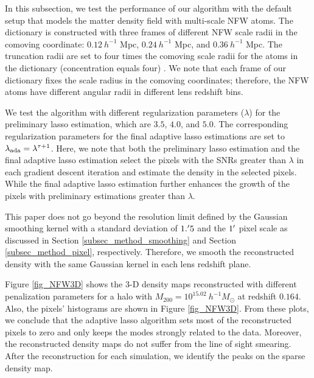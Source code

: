 In this subsection, we test the performance of our algorithm with the default
setup that models the matter density field with multi-scale NFW atoms. The
dictionary is constructed with three frames of different NFW scale radii in the
comoving coordinate: $0.12~h^{-1}$ Mpc, $0.24~h^{-1}$ Mpc, and $0.36~h^{-1}$
Mpc.  The truncation radii are set to four times the comoving scale radii for
the atoms in the dictionary (concentration equals four) . We note that each
frame of our dictionary fixes the scale radius in the comoving coordinates;
therefore, the NFW atoms have different angular radii in different lens
redshift bins.

We test the algorithm with different regularization parameters ($\lambda$) for
the preliminary lasso estimation, which are $3.5$, $4.0$, and $5.0$. The
corresponding regularization parameters for the final adaptive lasso
estimations are set to $\lambda_{\rm{ada}}=\lambda^{\tau+1}$.  Here, we note
that both the preliminary lasso estimation and the final adaptive lasso
estimation select the pixels with the SNRs greater than $\lambda$ in each
gradient descent iteration and estimate the density in the selected pixels.
While the final adaptive lasso estimation further enhances the growth of the
pixels with preliminary estimations greater than $\lambda$.

This paper does not go beyond the resolution limit defined by the Gaussian
smoothing kernel with a standard deviation of $1.\mbox{$^\prime$} 5$ and the $1\mbox{$^\prime$}$
pixel scale as discussed in Section \ref{subsec_method_smoothing} and Section
\ref{subsec_method_pixel}, respectively.  Therefore, we smooth the
reconstructed density with the same Gaussian kernel in each lens redshift
plane.

Figure \ref{fig_NFW3D} shows the $3$-D density maps reconstructed with
different penalization parameters for a halo with $M_{200}=10^{15.02}
~h^{-1}M_{\odot}$ at redshift $0.164$. Also, the pixels' histograms are shown
in Figure \ref{fig_NFW3D}. From these plots, we conclude that the adaptive
lasso algorithm sets most of the reconstructed pixels to zero and only keeps
the modes strongly related to the data. Moreover, the reconstructed density maps
do not suffer from the line of sight smearing. After the reconstruction for
each simulation, we identify the peaks on the sparse density map.

